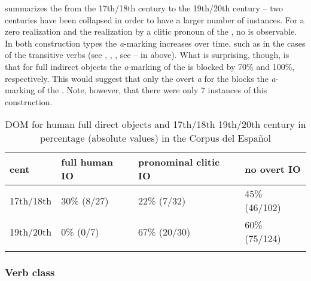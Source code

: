 \documentclass[output=paper]{LSP/langsci}
\begin{document}
 summarizes the  from the 17th/18th century to the 19th/\linebreak 20th century %
– two centuries have been collapsed in order to have a larger number of instances. For a zero realization and the realization by a clitic pronoun of the , no  is observable. In both construction types the \textit{a}-marking increases over time, such as in the cases of the transitive verbs (see \citealt{Melis1995Objetodirecto}, \citealt{Laca2006Objeto}, \citealt{vonHeusingeretal2007Differential,vonHeusinger2008Verbal}, see -- in  above). What is surprising, though, is that for full indirect objects the \textit{a}-marking of the  is blocked by 70\% and 100\%, respectively. 
This would suggest that only the overt \textit{a} for the  blocks the \textit{a}-marking of the . Note, however, that there were only 7 instances of this construction.

\begin{table}
\caption{DOM for human full direct objects and 17th/18th \vs 19th/20th century in percentage (absolute values) in the Corpus del Español }\label{11-he-tab:14}
\begin{tabularx}{\textwidth}{lQQQ}
\lsptoprule
cent & full human IO & pronominal clitic IO & no overt IO\\
\midrule
17th/18th & 30\% (8/27) & 22\% (7/32) & 45\% (46/102)\\
19th/20th & 0\% (0/7) & 67\% (20/30) & 60\% (75/124)\\
\lspbottomrule
\end{tabularx}
\end{table}

\subsubsection{Verb class}
\label{11-subsubsec:4-3-4}
\end{document}
